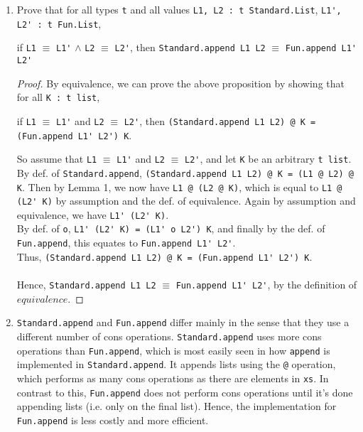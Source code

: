 \documentclass[11pt]{article}
\begin{document}
\begin{enumerate}
\begin{proof}
 \verb|op :: (1, (foldr op :: K ys)|.  By \verb|foldr|, this is \verb|(foldr op :: K y::ys)|.\\
Again using \verb|[xs:K]|, we have \verb|(fn xs => foldr op :: xs (y::ys)) K|.  This is now, by def. of \verb|Fun.fromList|, equivalent to \verb|Fun.fromList (y::ys) K|.\\
Thus, \verb|Standard.fromList (y::ys) @ K| $\equiv$ \verb|Fun.fromList (y::ys) @ K|, by the definition of $equivalence$.\\\\
Hence, by structural induction, P(L) holds for all lists of all sizes and we're done.
\end{proof}
\item Prove that for all types \verb|t| and all values \verb|L1, L2 : t Standard.List|, \verb|L1', L2' : t Fun.List|,
\begin{center}
if \verb|L1| $\equiv$ \verb|L1'| $\wedge$ \verb|L2| $\equiv$ \verb|L2'|, then 
\verb|Standard.append L1 L2| $\equiv$ \verb|Fun.append L1' L2'|
\end{center}
\begin{proof}
By equivalence, we can prove the above proposition by showing that for all \verb|K : t list|,
\begin{center}
if \verb|L1| $\equiv$ \verb|L1'| and \verb|L2| $\equiv$ \verb|L2'|, then
\verb|(Standard.append L1 L2) @ K = (Fun.append L1' L2') K|.
\end{center} 
So assume that \verb|L1| $\equiv$ \verb|L1'| and \verb|L2| $\equiv$ \verb|L2'|, and let \verb|K| be an arbitrary \verb|t list|.\\
By def. of \verb|Standard.append|, \verb|(Standard.append L1 L2) @ K = (L1 @ L2) @ K|.  Then by Lemma 1, we now have \verb|L1 @ (L2 @ K)|, which is equal to \verb|L1 @ (L2' K)| by assumption and the def. of equivalence.  Again by assumption and equivalence, we have \verb|L1' (L2' K)|.\\
By def. of \verb|o|, \verb|L1' (L2' K) = (L1' o L2') K|, and finally by the def. of \verb|Fun.append|, this equates to \verb|Fun.append L1' L2'|.\\
Thus, \verb|(Standard.append L1 L2) @ K = (Fun.append L1' L2') K|.\\\\
Hence, \verb|Standard.append L1 L2| $\equiv$ \verb|Fun.append L1' L2'|, by the definition of $equivalence$.
\end{proof}
\item \verb|Standard.append| and \verb|Fun.append| differ mainly in the sense that they use a different number of cons operations.  \verb|Standard.append| uses more cons operations than \verb|Fun.append|, which is most easily seen in how \verb|append| is implemented in \verb|Standard.append|.  It appends lists using the \verb|@| operation, which performs as many cons operations as there are elements in \verb|xs|.   In contrast to this, \verb|Fun.append| does not perform cons operations until it's done appending lists (i.e. only on the final list).  Hence, the implementation for \verb|Fun.append| is less costly and more efficient.
\end{enumerate}
\end{document}
